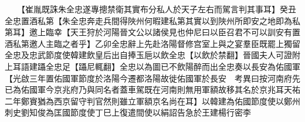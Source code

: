 　　【崔胤既誅朱全忠遂專摠禁衛其實布分私人於天子左右而駕言判其事耳】癸丑全忠置酒私第【朱全忠奔走兵間得陜州何暇建私第其實以到陜州所即安之地即為私第耳】邀上臨幸【天王狩於河陽晉文公以諸侯見也仲尼曰以臣召君不可以訓安有置酒私第邀人主臨之者乎】乙卯全忠辭上先赴洛陽督修宫室上與之宴羣臣既罷上獨留全忠及忠武節度使韓建飲皇后出自捧玉巵以飲全忠【以飲於禁翻】晉國夫人可證附上耳語建躡全忠足【躡尼輒翻】全忠以為圖已不飲陽醉而出全忠奏以長安為佑國軍【光啟三年置佑國軍節度於洛陽今遷都洛陽故徙佑國軍於長安　考異曰按河南府先已為佑國軍今京兆府乃與同名者蓋車駕既在河南則無用軍額故移其名於京兆耳天祐二年鄭賨猶為西京留守判官然則雖立軍額京名尚在耳】以韓建為佑國節度使以鄭州刺史劉知俊為匡國節度使丁巳上復遣間使以絹詔告急於王建楊行密李